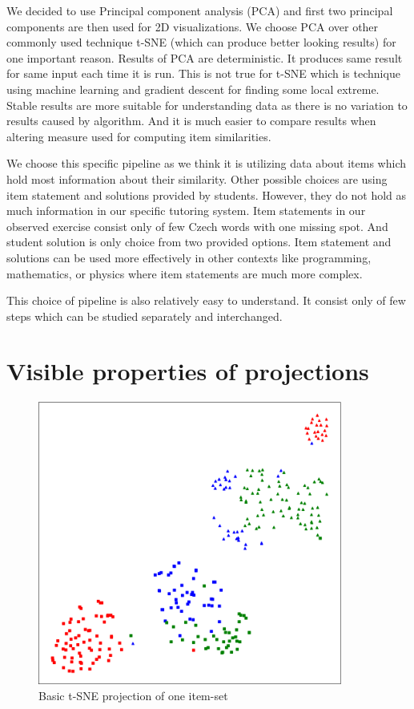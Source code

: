 \documentclass[
  digital, %
  table,   %
  nolof,     %
  nolot,     %
  nocover
]{fithesis3}
\begin{document}

We decided to use Principal component analysis (PCA) and first two principal components are then used for 2D visualizations. We choose PCA over other commonly used technique t-SNE (which can produce better looking results) for one important reason. Results of PCA are deterministic. It produces same result for same input each time it is run. This is not true for t-SNE which is technique using machine learning and gradient descent for finding some local extreme. Stable results are more suitable for understanding data as there is no variation to results caused by algorithm. And it is much easier to compare results when altering measure used for computing item similarities.


We choose this specific pipeline as we think it is utilizing data about items which hold most information about their similarity. Other possible choices are using item statement and solutions provided by students. However, they do not hold as much information in our specific tutoring system. Item statements in our observed exercise consist only of few Czech words with one missing spot. And student solution is only choice from two provided options. Item statement and solutions can be used more effectively in other contexts like programming, mathematics, or physics where item statements are much more complex.

This choice of pipeline is also relatively easy to understand. It consist only of few steps which can be studied separately and interchanged.

\section{Visible properties of projections}\label{visible-properties-of-projections}


\begin{figure}
    \includegraphics[width=10cm]{img/common_projection}
  \caption{Basic t-SNE projection of one item-set}
  \label{fig:common_projection}
\end{figure}
\end{document}
